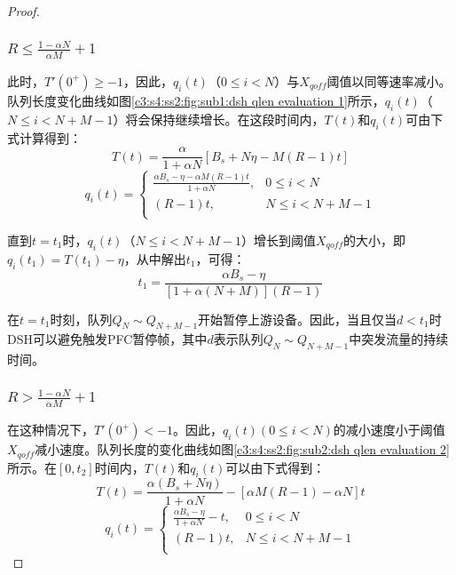 \begin{proof}
  \setcounter{subsubsection}{0}
  \subsubsection{$R \leqslant \frac{1-\alpha N}{\alpha M} + 1$}

  此时，$T'(0^+) \geqslant -1$，因此，$q_i(t)$（$0 \leqslant i < N$）与$X_{\mathit{qoff}}$阈值以同等速率减小。队列长度变化曲线如图\ref{c3:s4:ss2:fig:sub1:dsh qlen evaluation 1}所示，$q_i(t)$（$N \leqslant i < N + M - 1$）将会保持继续增长。在这段时间内，$T(t)$和$q_i(t)$可由下式计算得到：
  \begin{equation}
    T(t)=\frac{\alpha}{1+\alpha N}[B_s+N\eta-M(R-1)t]
  \end{equation}
  \begin{equation}
    q_i(t)=
    \begin{cases}
      \frac{\alpha B_s-\eta-\alpha M(R-1)t}{1+\alpha N}, 
      & 0 \leqslant i < N \\
      (R-1)t, & N \leqslant i < N + M -1 \\
    \end{cases}
  \end{equation}  

  直到$t=t_1$时，$q_i(t)$（$N \leqslant i < N + M - 1$）增长到阈值$X_{\mathit{qoff}}$的大小，即$q_i(t_1)=T(t_1)-\eta$，从中解出$t_1$，可得：
  \begin{equation}
    t_1=\frac{\alpha B_s - \eta}{[1+\alpha (N+M)](R-1)}
  \end{equation}

  在$t=t_1$时刻，队列$Q_N \sim Q_{N+M-1}$开始暂停上游设备。因此，当且仅当$d<t_1$时DSH可以避免触发PFC暂停帧，其中$d$表示队列$Q_N \sim Q_{N+M-1}$中突发流量的持续时间。

  \subsubsection{$R>\frac{1-\alpha N}{\alpha M}+1$}

  在这种情况下，$T'(0^+)<-1$。因此，$q_i(t)(0 \leqslant i < N)$的减小速度小于阈值$X_{\mathit{qoff}}$减小速度。队列长度的变化曲线如图\ref{c3:s4:ss2:fig:sub2:dsh qlen evaluation 2}所示。在$[0,t_2]$时间内，$T(t)$和$q_i(t)$可以由下式得到：
  \begin{equation}
    T(t)=\frac{\alpha(B_s+N\eta)}{1+\alpha N}-[\alpha M(R-1)-\alpha N]t
  \end{equation}
  \begin{equation}
    q_i(t)=
    \begin{cases}
      \frac{\alpha B_s-\eta}{1+\alpha N}-t, 
      & 0 \leqslant i < N \\
      (R-1)t, & N \leqslant i < N + M -1 \\
    \end{cases}
  \end{equation}


\end{proof}

